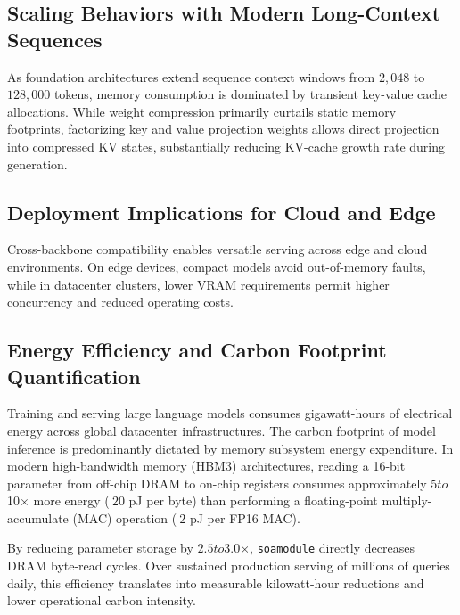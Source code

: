 \subsection{Scaling Behaviors with Modern Long-Context Sequences}
As foundation architectures extend sequence context windows from $2{,}048$ to $128{,}000$ tokens, memory consumption is dominated by transient key-value cache allocations. While weight compression primarily curtails static memory footprints, factorizing key and value projection weights allows direct projection into compressed KV states, substantially reducing KV-cache growth rate during generation.

\subsection{Deployment Implications for Cloud and Edge}
Cross-backbone compatibility enables versatile serving across edge and cloud environments. On edge devices, compact models avoid out-of-memory faults, while in datacenter clusters, lower VRAM requirements permit higher concurrency and reduced operating costs.

\subsection{Energy Efficiency and Carbon Footprint Quantification}
Training and serving large language models consumes gigawatt-hours of electrical energy across global datacenter infrastructures. The carbon footprint of model inference is predominantly dictated by memory subsystem energy expenditure. In modern high-bandwidth memory (HBM3) architectures, reading a 16-bit parameter from off-chip DRAM to on-chip registers consumes approximately $5$\times$ to $10$\times$ more energy ($~20$ pJ per byte) than performing a floating-point multiply-accumulate (MAC) operation ($~2$ pJ per FP16 MAC).

By reducing parameter storage by $2.5$\times$ to $3.0$\times$, \texttt{soamodule} directly decreases DRAM byte-read cycles. Over sustained production serving of millions of queries daily, this efficiency translates into measurable kilowatt-hour reductions and lower operational carbon intensity.
